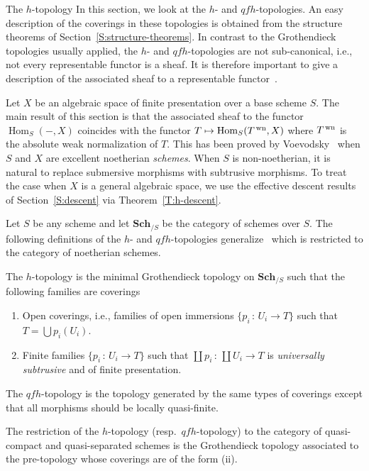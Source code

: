 \documentclass[a4paper,twoside,11pt]{amsart}[2009/07/02] %
\newcommand{\pref}[1]{\eqref{#1}}
\DeclareMathOperator{\Hom}{Hom}
\newcommand{\map}[3]{#1\,:\, #2\rightarrow #3}
\newcommand{\Sch}{\mathbf{Sch}} %
\newcommand{\normcmd}[3]{%
#2%
\ifx\\#1\\%
^{\,\mathrm{#3}}%
\else%
^{#1/\mathrm{#3}}%
\fi%
}
\newcommand{\wn}[2]{\normcmd{#1}{#2}{wn}} %
\begin{document}
\begin{section}{The $h$-topology}\label{S:h-top}
In this section, we look at the $h$- and $qfh$-topologies. An easy description
of the coverings in these topologies is obtained from the structure theorems of
Section~\ref{S:structure-theorems}. In contrast to the Grothendieck topologies
usually applied, the $h$- and $qfh$-topologies are not sub-canonical, i.e., not
every representable functor is a sheaf. It is therefore important to give a
description of the associated sheaf to a representable
functor~\cite{voevodsky_homology,brenner_Groth-top}.

Let $X$ be an algebraic space of finite presentation over a base scheme $S$.
The main result of this section is that the associated sheaf to the functor
$\Hom_S(-,X)$ coincides with the functor $T\mapsto \Hom_S(\wn{}{T},X)$ where
$\wn{}{T}$ is the absolute weak normalization of $T$. This has been proved by
Voevodsky~\cite{voevodsky_homology} when $S$ and $X$ are excellent noetherian
\emph{schemes}.
%
When $S$ is non-noetherian, it is natural to replace submersive morphisms
with subtrusive morphisms.
%
To treat the case when $X$ is a general algebraic space, we use the effective
descent results of Section~\ref{S:descent} via Theorem~\pref{T:h-descent}.

Let $S$ be any scheme and let $\Sch_{/S}$ be the category of schemes
over $S$. The following definitions of the $h$- and $qfh$-topologies
generalize~\cite[Def.~3.1.2]{voevodsky_homology} which is restricted to the
category of noetherian schemes.


\begin{definition}\label{D:h-topology}
The $h$-topology is the minimal Grothendieck topology on $\Sch_{/S}$ such that
the following families are coverings
%
\begin{enumerate}
\item Open coverings, i.e., families of open immersions $\{\map{p_i}{U_i}{T}\}$
such that $T=\bigcup p_i(U_i)$.
\item Finite families $\{\map{p_i}{U_i}{T}\}$ such that
$\map{\coprod p_i}{\coprod U_i}{T}$ is \emph{universally subtrusive} and of
finite presentation.
\end{enumerate}
%
The $qfh$-topology is the topology generated by the same types of coverings
except that all morphisms should be locally quasi-finite.
\end{definition}

\begin{remark}
The restriction of the $h$-topology (resp.\ $qfh$-topology) to the category of
quasi-compact and quasi-separated schemes is the Grothendieck topology
associated to the pre-topology whose coverings are of the form (ii).
\end{remark}


\end{section}
\end{document}
